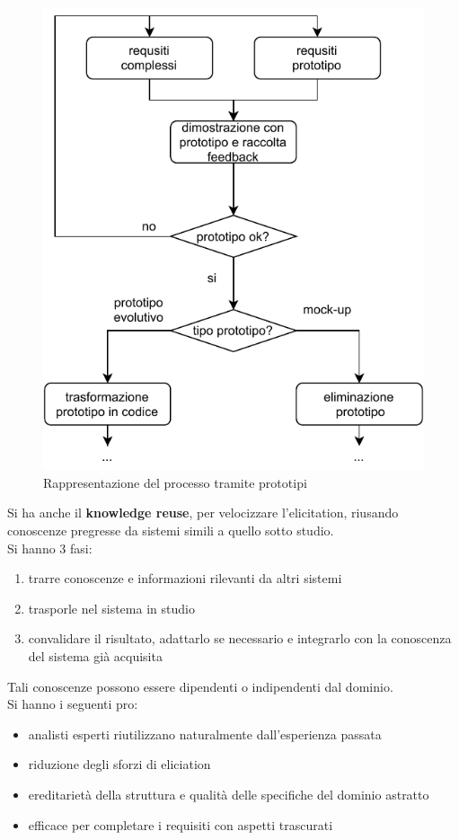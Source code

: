\documentclass[a4paper,12pt, oneside]{book}
\begin{document}
\begin{figure}
  \centering
  \includegraphics[scale = 0.8]{img/re4.pdf}
  \caption{Rappresentazione del processo tramite prototipi}
\end{figure}
Si ha anche il \textbf{knowledge reuse}, per velocizzare l'elicitation, riusando
conoscenze pregresse da sistemi simili a quello sotto studio.\\
Si hanno 3 fasi:
\begin{enumerate}
  \item trarre conoscenze e informazioni rilevanti da altri sistemi
  \item trasporle nel sistema in studio
  \item convalidare il risultato, adattarlo se necessario e integrarlo con la
  conoscenza del sistema già acquisita
\end{enumerate}
Tali conoscenze possono essere dipendenti o indipendenti dal dominio.\\
Si hanno i seguenti pro:
\begin{itemize}
  \item analisti esperti riutilizzano naturalmente dall'esperienza passata
  \item riduzione degli sforzi di eliciation
  \item ereditarietà della struttura e qualità delle specifiche del dominio
  astratto 
  \item efficace per completare i requisiti con aspetti trascurati
\end{itemize}
\end{document}
